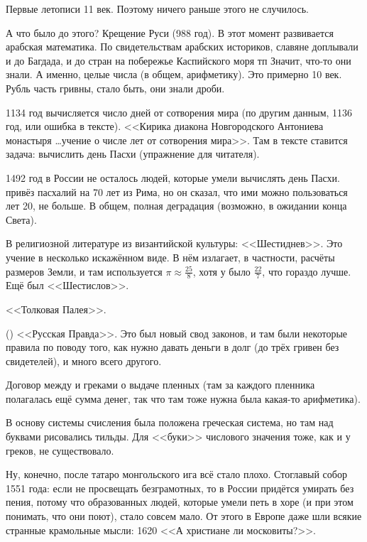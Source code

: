 \documentclass[a4paper,oneside,fleqn,10pt]{article}
\begin{document}
Первые летописи 11 век. Поэтому ничего раньше этого не случилось.

А что было до этого? Крещение Руси (988 год). В этот момент развивается
арабская математика. По свидетельствам арабских историков,
славяне доплывали и до Багдада, и до стран на побережье Каспийского моря тп
Значит, что-то они знали. А именно, целые числа (в общем, арифметику).
Это примерно 10 век. Рубль часть гривны, стало быть, они знали дроби.

1134 год вычисляется число дней от сотворения мира (по другим данным, 1136 год,
или ошибка в тексте). <<Кирика диакона Новгородского Антониева монастыря \ldots учение о числе
лет от сотворения мира>>. Там в тексте ставится задача: вычислить день Пасхи (упражнение
для читателя).

1492 год в России не осталось людей, которые умели вычислять день Пасхи.
 привёз пасхалий на 70 лет из Рима, но он сказал, что ими
можно пользоваться лет 20, не больше.
В общем, полная деградация (возможно, в ожидании конца Света).

В религиозной литературе из византийской культуры: <<Шестиднев>>. Это учение
 в несколько искажённом виде.
В нём  излагает, в частности,
расчёты размеров Земли, и там используется $\pi \approx \frac{25}{8}$,
хотя у  было $\frac{22}{7}$, что гораздо лучше. Ещё был <<Шестислов>>.

<<Толковая Палея>>.

 () <<Русская Правда>>. Это был новый свод законов,
и там были некоторые правила по поводу того, как нужно давать деньги в долг
(до трёх гривен без свидетелей), и много всего другого.

Договор между  и греками о выдаче пленных (там за каждого пленника полагалась
ещё сумма денег, так что там тоже нужна была какая-то арифметика).

В основу системы счисления была положена греческая система, но там над буквами рисовались тильды.
Для <<буки>> числового значения тоже, как и у греков, не существовало.

Ну, конечно, после татаро монгольского ига всё стало плохо.
Стоглавый собор 1551 года: если не просвещать безграмотных, то в России придётся
умирать без пения, потому что образованных людей, которые умели петь
в хоре (и при этом понимать, что они поют), стало совсем мало.
От этого в Европе даже шли всякие странные крамольные мысли:
1620  <<А христиане ли московиты?>>.
\end{document}
